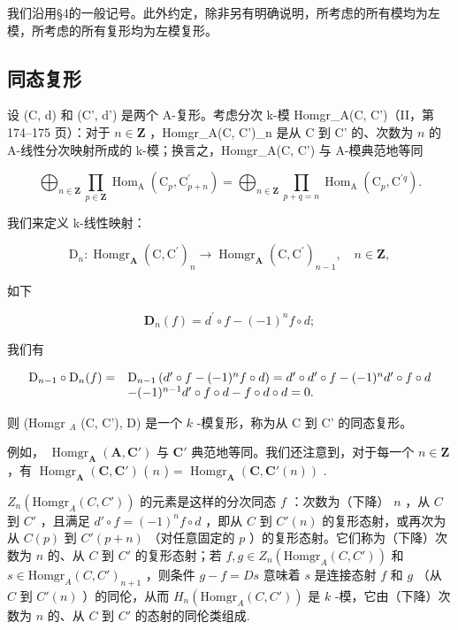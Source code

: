 我们沿用§4的一般记号。此外约定，除非另有明确说明，所考虑的所有模均为左模，所考虑的所有复形均为左模复形。

\subsection{同态复形}

设 (C, d) 和 (C', d') 是两个 A-复形。考虑分次 k-模 Homgr\_A(C, C')（II，第 174–175 页）：对于 \(n \in \mathbf{Z}\) ，Homgr\_A(C, C')\_n 是从 C 到 C' 的、次数为 \(n\) 的 A-线性分次映射所成的 k-模；换言之，Homgr\_A(C, C') 与 A-模典范地等同

\[
\bigoplus_ {n \in \mathbf {Z}} \prod_ {p \in \mathbf {Z}} \operatorname{Hom} _ {\mathrm{A}} \left(\mathrm{C} _ {p}, \mathrm{C} _ {p + n} ^ {\prime}\right) = \bigoplus_ {n \in \mathbf {Z}} \prod_ {p + q = n} \operatorname{Hom} _ {\mathrm{A}} \left(\mathrm{C} _ {p}, \mathrm{C} ^ {\prime q}\right).
\]

我们来定义 k-线性映射：

\[
\mathrm{D} _ {n}: \operatorname{Homgr} _ {\mathbf {A}} (\mathrm{C}, \mathrm{C} ^ {\prime}) _ {n} \rightarrow \operatorname{Homgr} _ {\mathbf {A}} (\mathrm{C}, \mathrm{C} ^ {\prime}) _ {n - 1}, \quad n \in \mathbf {Z},
\]

如下

\[
\mathbf {D} _ {n} (f) = d ^ {\prime} \circ f - (- 1) ^ {n} f \circ d;\tag{1}
\]

我们有

\[
\begin{array}{r l} \mathrm{D} _ {n - 1} \circ \mathrm{D} _ {n} (f) = & \mathrm{D} _ {n - 1} \left(d ^ {\prime} \circ f - (- 1) ^ {n} f \circ d\right) = d ^ {\prime} \circ d ^ {\prime} \circ f - (- 1) ^ {n} d ^ {\prime} \circ f \circ d \\ & - (- 1) ^ {n - 1} d ^ {\prime} \circ f \circ d - f \circ d \circ d = 0. \end{array}
\]

则 (Homgr \(_{A}\) (C, C'), D) 是一个 \(k\) -模复形，称为从 C 到 C' 的同态复形。

例如， \(\operatorname{Homgr}_{\mathbf{A}}(\mathbf{A}, \mathbf{C}')\) 与 \(\mathbf{C}'\) 典范地等同。我们还注意到，对于每一个 \(n \in \mathbf{Z}\) ，有 \(\operatorname{Homgr}_{\mathbf{A}}(\mathbf{C}, \mathbf{C}')\) ( \(n\) ) = \(\operatorname{Homgr}_{\mathbf{A}}(\mathbf{C}, \mathbf{C}'(n))\) .

\(Z_n(\text{Homgr}_A(C, C'))\) 的元素是这样的分次同态 \(f\) ：次数为（下降） \(n\) ，从 \(C\) 到 \(C'\) ，且满足 \(d' \circ f = (-1)^n f \circ d\) ，即从 \(C\) 到 \(C'(n)\) 的复形态射，或再次为从 \(C(p)\) 到 \(C'(p + n)\) （对任意固定的 \(p\) ）的复形态射。它们称为（下降）次数为 \(n\) 的、从 \(C\) 到 \(C'\) 的复形态射；若 \(f, g \in Z_n(\text{Homgr}_A(C, C'))\) 和 \(s \in \text{Homgr}_A(C, C')_{n+1}\) ，则条件 \(g - f = Ds\) 意味着 \(s\) 是连接态射 \(f\) 和 \(g\) （从 \(C\) 到 \(C'(n)\) ）的同伦，从而 \(H_n(\text{Homgr}_A(C, C'))\) 是 \(k\) -模，它由（下降）次数为 \(n\) 的、从 \(C\) 到 \(C'\) 的态射的同伦类组成.


